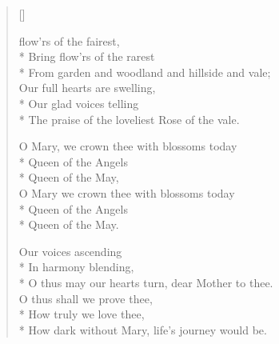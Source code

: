 \newHymn

\settowidth{\versewidth}{O Mary, we crown thee with blossoms}
\begin{verse}[\versewidth]

 flow'rs of the fairest,\\*
Bring flow'rs of the rarest \\*
From garden and woodland and hillside and vale;\\
Our full hearts are swelling,\\*
Our glad voices telling\\*
The praise of the loveliest Rose of the vale.

\begin{patverse}
O Mary, we crown thee with blossoms today\\*
Queen of the Angels \\*
Queen of the May,\\
O Mary we crown thee with blossoms today\\*
Queen of the Angels \\*
Queen of the May.
\end{patverse}

 Our voices ascending\\*
In harmony blending,\\*
O thus may our hearts turn, dear Mother to thee.\\
O thus shall we prove thee,\\*
How truly we love thee,\\*
How dark without Mary, life's journey would be.

\end{verse}

